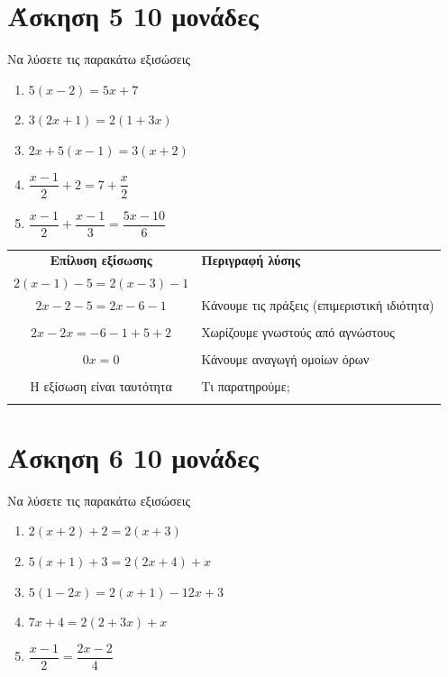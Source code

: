 \documentclass[a4paper,10pt]{report}
\begin{document}
\section*{Άσκηση 5  \hfill \small{10 μονάδες}}
Να λύσετε τις παρακάτω εξισώσεις
\begin{enumerate}[1)]
 \item $5(x-2)=5x+7$
 \item $3(2x+1)=2(1+3x)$
 \item $2x+5(x-1)=3(x+2)$
 \item $\dfrac{x-1}{2}+2=7+\dfrac{x}{2}$
 \item $\dfrac{x-1}{2}+\dfrac{x-1}{3}=\dfrac{5x-10}{6}$
\end{enumerate}
\vspace{3em}
\begin{center}
 \begin{tabular}{|c|l|}\hline 
\textbf{Επίλυση εξίσωσης} \quad        &    \textbf{Περιγραφή λύσης}       \\
$2(x-1)-5=2(x-3)-1$     \quad \quad                 &         \\
\hline 
 $2x-2-5=2x-6-1$                                 & Κάνουμε τις πράξεις (επιμεριστική ιδιότητα)\\ 
                                  & \\                               
\hline
$2x-2x=-6-1+5+2$                                  &  Χωρίζουμε γνωστούς από αγνώστους        \\
                                  & \\                               
 
\hline
$0x=0$                                  & Κάνουμε αναγωγή ομοίων όρων       \\
                                  & \\
\hline
Η εξίσωση είναι ταυτότητα                                  &  Τι παρατηρούμε;     \\
                                  & \\  
\hline 
\end{tabular}
\end{center}
\section*{Άσκηση 6  \hfill \small{10 μονάδες}}
Να λύσετε τις παρακάτω εξισώσεις
\begin{enumerate}[1)]
 \item $2(x+2)+2=2(x+3)$
 \item $5(x+1)+3=2(2x+4)+x$
 \item $5(1-2x)=2(x+1)-12x+3$
 \item $7x+4=2(2+3x)+x$
 \item $\dfrac{x-1}{2}=\dfrac{2x-2}{4}$
\end{enumerate}
\end{document}
